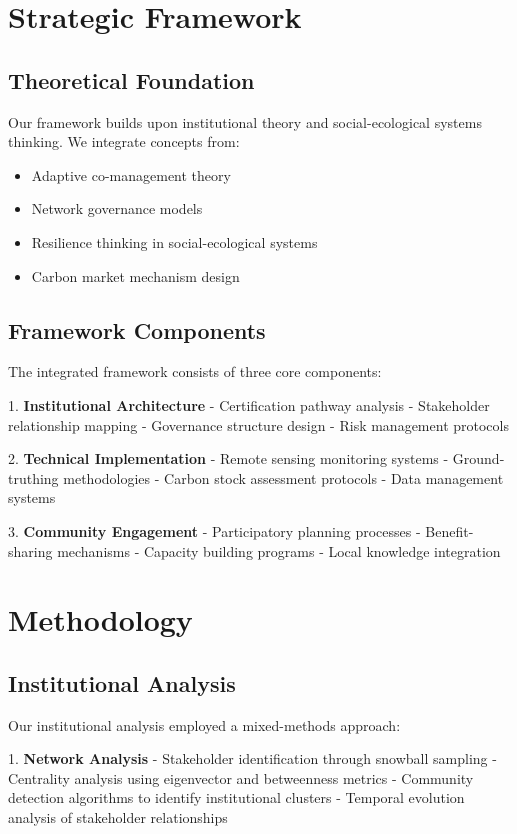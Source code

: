 \documentclass{article}
\theoremstyle{plain}
\theoremstyle{definition}
\theoremstyle{remark}
\begin{document}
\begin{multicols}{2}
\section{Strategic Framework}

\subsection{Theoretical Foundation}
Our framework builds upon institutional theory and social-ecological systems thinking. We integrate concepts from:
\begin{itemize}
    \item Adaptive co-management theory
    \item Network governance models
    \item Resilience thinking in social-ecological systems
    \item Carbon market mechanism design
\end{itemize}

\subsection{Framework Components}
The integrated framework consists of three core components:

1. \textbf{Institutional Architecture}
   - Certification pathway analysis
   - Stakeholder relationship mapping
   - Governance structure design
   - Risk management protocols

2. \textbf{Technical Implementation}
   - Remote sensing monitoring systems
   - Ground-truthing methodologies
   - Carbon stock assessment protocols
   - Data management systems

3. \textbf{Community Engagement}
   - Participatory planning processes
   - Benefit-sharing mechanisms
   - Capacity building programs
   - Local knowledge integration

\section{Methodology}

\subsection{Institutional Analysis}
Our institutional analysis employed a mixed-methods approach:

1. \textbf{Network Analysis}
   - Stakeholder identification through snowball sampling
   - Centrality analysis using eigenvector and betweenness metrics
   - Community detection algorithms to identify institutional clusters
   - Temporal evolution analysis of stakeholder relationships


\end{multicols}
\end{document}
